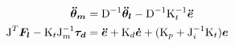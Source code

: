 \documentclass[journal]{IEEEtran}
\newcommand{\vectm}[1]{ { {\text #1} }}
\newcommand{\vects}[1]{{\boldsymbol {#1}}}
\begin{document}
\setlength{\arraycolsep}{0.0em}
\begin{align}
\label{JTFC2_error_equation1}
\vects{\ddot{\theta}_m} &= \vectm{D^{-1}} \vects{\ddot{\theta}_l} - \vectm{D^{-1}} \vectm{K_t^{-1}} \vects{\ddot{e}}
\\
\label{JTFC2_error_equation2}
\vectm{J^T} \vects{F_l} - \vectm{K_t} \vectm{J^{-1}_m} \vects{\tau_d}& = \vects{\ddot{e}} + \vectm{K_d} \vects{\dot{e}} + (\vectm{K_p} + \vectm{J^{-1}_i} \vectm{K_t}) \vects{e}
\end{align}
\setlength{\arraycolsep}{5pt}


%
%
%

%
\end{document}
